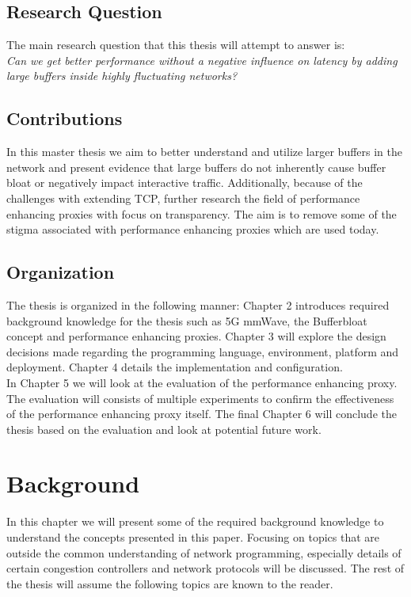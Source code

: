 \documentclass[a4paper,english, 11pt]{report}
\begin{document}
\section{Research Question}
The main research question that this thesis will attempt to answer is:\\
\textit{Can we get better performance without a negative influence on latency by adding large buffers inside highly fluctuating networks?}

\section{Contributions}
In this master thesis we aim to better understand and utilize larger buffers in the network and present evidence that large buffers do not inherently cause buffer bloat or negatively impact interactive traffic. Additionally, because of the challenges with extending TCP\cite{tcp_extendable}, further research the field of performance enhancing proxies with focus on transparency. The aim is to remove some of the stigma associated with performance enhancing proxies which are used today.

\section{Organization}
The thesis is organized in the following manner: Chapter 2 introduces required background knowledge for the thesis such as 5G mmWave, the Bufferbloat concept and performance enhancing proxies. Chapter 3 will explore the design decisions made regarding the programming language, environment, platform and deployment. Chapter 4 details the implementation and configuration.\\

In Chapter 5 we will look at the evaluation of the performance enhancing proxy. The evaluation will consists of multiple experiments to confirm the effectiveness of the performance enhancing proxy itself. The final Chapter 6 will conclude the thesis based on the evaluation and look at potential future work.
\chapter{Background}

In this chapter we will present some of the required background knowledge to understand the concepts presented in this paper. Focusing on topics that are outside the common understanding of network programming, especially details of certain congestion controllers and network protocols will be discussed. The rest of the thesis will assume the following topics are known to the reader.\\
\end{document}
